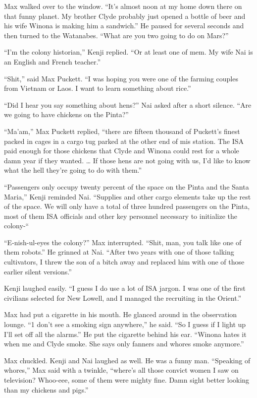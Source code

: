 \documentclass[]{article}
\begin{document}
{Max walked over to the window. “It’s almost noon at my home down there on that funny planet. My brother Clyde probably just opened a bottle of beer and his wife Winona is making him a sandwich.” He paused for several seconds and then turned to the Watanabes. “What are you two going to do on Mars?”

“I’m the colony historian,” Kenji replied. “Or at least one of mem. My wife Nai is an English and French teacher.”

“Shit,” said Max Puckett. “I was hoping you were one of the farming couples from Vietnam or Laos. I want to learn something about rice.”

“Did I hear you say something about hens?” Nai asked after a short silence. “Are we going to have chickens on the Pinta?”

“Ma’am,” Max Puckett replied, “there are fifteen thousand of Puckett’s finest packed in cages in a cargo tug parked at the other end of mis station. The ISA paid enough for those chickens that Clyde and Winona could rest for a whole damn year if they wanted. … If those hens are not going with us, I’d like to know what the hell they’re going to do with them.”

“Passengers only occupy twenty percent of the space on the Pinta and the Santa Maria,” Kenji reminded Nai. “Supplies and other cargo elements take up the rest of the space. We will only have a total of three hundred passengers on the Pinta, most of them ISA officials and other key personnel necessary to initialize the colony-“

“E-nish-ul-eyes the colony?” Max interrupted. “Shit, man, you talk like one of them robots.” He grinned at Nai. “After two years with one of those talking cultivators, I threw the son of a bitch away and replaced him with one of those earlier silent versions.”

Kenji laughed easily. “I guess I do use a lot of ISA jargon. I was one of the first civilians selected for New Lowell, and I managed the recruiting in the Orient.”

Max had put a cigarette in his mouth. He glanced around in the observation lounge. “1 don’t see a smoking sign anywhere,” he said. “So I guess if I light up I’ll set off all the alarms.” He put the cigarette behind his ear. “Winona hates it when me and Clyde smoke. She says only fanners and whores smoke anymore.”

Max chuckled. Kenji and Nai laughed as well. He was a funny man. “Speaking of whores,” Max said with a twinkle, “where’s all those convict women I saw on television? Whoo-eee, some of them were mighty fine. Damn sight better looking than my chickens and pigs.”

}
\end{document}
